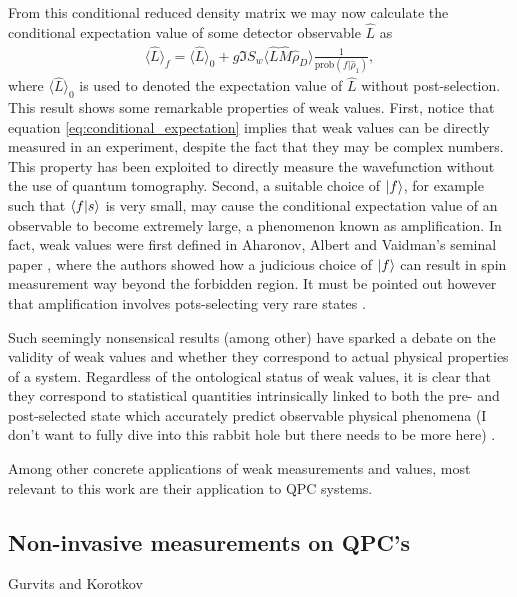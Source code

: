 \documentclass{article}
\newcommand\sj[1]{ {\color{orange} #1} }
\begin{document}
From this conditional reduced density matrix we may now calculate the conditional
expectation value of some detector observable $\hat{L}$ as 
\begin{align}\label{eq:conditional_expectation}
    \langle \hat{L}\rangle_{f} = \langle \hat{L} \rangle_0 + g \Im{S_{w}\langle \hat{L}\hat{M}\hat{\rho}_{D} \rangle \frac{1}{\text{prob}(f|\hat{\rho}_1)}},
\end{align}
where $\langle \hat{L} \rangle_0$ is used to denoted the expectation value of $\hat{L}$ without post-selection. This result shows some remarkable properties of weak values. First, notice that 
equation \eqref{eq:conditional_expectation} implies that weak values can be directly measured in 
an experiment, despite the fact that they may be complex numbers. This property has been exploited
to directly measure the wavefunction \cite{lundeenDirectMeasurementQuantum2011} without the use 
of quantum tomography. Second, a suitable choice of $\ket{f}$, 
for example such that $\bra{f}\ket{s}$ is very small, may cause the conditional expectation value 
of an observable to become extremely large, a phenomenon known as amplification. In fact, weak values were first defined in Aharonov, Albert and Vaidman's seminal paper 
\cite{aharonovHowResultMeasurement1988}, where the authors showed how a judicious choice of $\ket{f}$
can result in spin measurement way beyond the forbidden region. It must be pointed out however that
amplification involves pots-selecting very rare states \cite{svenssonPedagogicalWeak2013}.

Such seemingly nonsensical results (among other) have sparked a debate on the validity of weak 
values and whether they correspond to actual physical properties of a system. Regardless of the 
ontological status of weak values, it is clear that they correspond to
statistical quantities intrinsically linked to both the pre- and post-selected state 
\cite{alonsoQuantumAveragesWeak2005} which accurately
predict observable physical phenomena  \sj{(I don't want to 
fully dive into this rabbit hole but there needs to be more here)}.

Among other concrete applications of weak measurements and values, most relevant to this work 
are their application to QPC systems. 

\subsection{Non-invasive measurements on QPC's}

Gurvits and Korotkov 
\end{document}
